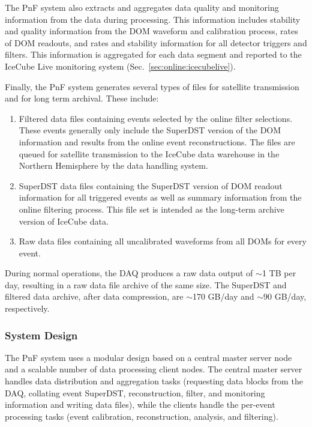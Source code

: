 The PnF system also extracts and aggregates data quality and monitoring
information from the data during processing.  This information includes
stability and quality information from the DOM waveform and calibration
process, rates of DOM readouts, and rates and 
stability information for all detector triggers and filters.  This
information is aggregated for each data segment and reported to the IceCube
Live monitoring system (Sec.~\ref{sec:online:icecubelive}).

Finally, the PnF system generates several types of files for satellite
transmission and for long term archival. These
include:   
\begin{enumerate}
\item Filtered data files containing events selected by the online filter
  selections.  These events generally only include the SuperDST version of
  the DOM information and results from the online event reconstructions.
  The files are queued for satellite transmission to the IceCube data
  warehouse in the Northern Hemisphere by the data handling system.
\item SuperDST data files containing the SuperDST version of DOM readout
  information for all triggered events as well as summary information from
  the online filtering process.  This file set is intended as the long-term
  archive version of IceCube data.
\item Raw data files containing all uncalibrated waveforms from all DOMs for
  every event.  %
\end{enumerate}

During normal operations, the DAQ produces a raw data output of
$\sim$1 TB per day, resulting in a raw data file 
archive of the same size.  The SuperDST and filtered data archive, after
data compression, are $\sim$170 GB/day and $\sim$90 GB/day, respectively.

\subsubsection{System Design}

The PnF system uses a modular design based on
a central master server node and a scalable number of data processing client
nodes.  The central master server handles data distribution and
aggregation tasks (requesting data blocks from the DAQ, collating event
SuperDST, reconstruction, filter, and monitoring information and writing
data files), while the clients handle the per-event processing
tasks (event calibration, reconstruction, analysis, and filtering).

